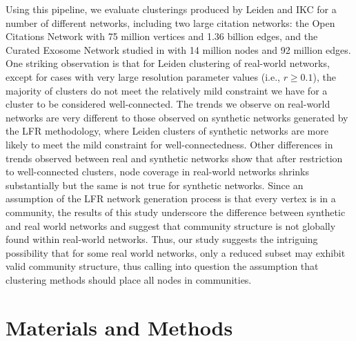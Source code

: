 \documentclass[11pt]{article}   	%
\begin{document}
Using this pipeline, we evaluate clusterings produced by Leiden and IKC for a number of different networks, including two large citation networks: the Open Citations Network with 75 million vertices and 1.36 billion edges, and the Curated Exosome Network studied
in \cite{Jakatdar_2022} with 14 million nodes and 92 million edges.
One striking observation is that for Leiden clustering of real-world networks, except for cases with very large resolution parameter values (i.e., $r \geq 0.1$), the majority of clusters do not meet the relatively mild constraint we have for a cluster to be considered well-connected.
The trends we observe on real-world networks are very different to those observed on synthetic networks   generated by the LFR methodology, where Leiden clusters of
synthetic networks are more likely to meet the mild constraint for well-connectedness.
Other differences in trends observed between real and synthetic networks show that after restriction to well-connected clusters, node coverage in real-world networks shrinks substantially but the same is not true for synthetic networks.  Since an assumption of the LFR network generation process  is that every vertex  is in a community, the results of this study
underscore the difference between synthetic and real world networks and suggest that community structure is not globally found within real-world networks.
Thus, our study suggests the intriguing possibility that for some  real world networks, only a reduced subset may exhibit valid community structure,
thus calling into question the assumption that  clustering methods should place all nodes in communities.



\section{Materials and Methods}
\end{document}
